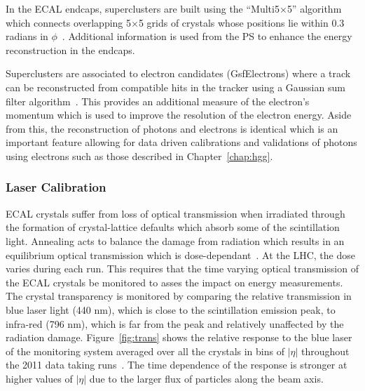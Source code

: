In the ECAL endcaps, superclusters are built using the ``Multi5$\times$5'' algorithm which 
connects overlapping 5$\times$5 grids of crystals whose positions lie within 
0.3 radians in $\phi$~\citep{AN-09-164}. 
Additional information is used from the PS to enhance the energy reconstruction in the endcaps. 

Superclusters are associated to electron candidates (GsfElectrons) 
where a track can be reconstructed from
compatible hits in the tracker using a Gaussian sum filter algorithm~\citep{GSF_Electron_Reconstruction_CMS}.  
This provides an additional measure of the electron's momentum which is used 
to improve the resolution of the electron energy.
Aside from this, the reconstruction of photons and electrons is identical which is an 
important feature allowing for data driven calibrations and validations of photons using 
electrons such as those described in Chapter~\ref{chap:hgg}.


\subsubsection{Laser Calibration}

ECAL crystals suffer from loss of optical transmission when irradiated through 
the formation of crystal-lattice defaults which absorb some of the scintillation light. Annealing
acts to balance the damage from radiation which results in an equilibrium optical 
transmission which is dose-dependant~\citep{TDR1}. 
At the LHC, the dose varies during each run. This requires that the time varying optical transmission of the ECAL 
crystals be monitored to asses the impact on energy measurements.
The crystal transparency is monitored by comparing the relative transmission in blue laser light (440 nm), 
which is close to the scintillation emission peak, to infra-red (796 nm), which is far from the 
peak and relatively unaffected by the radiation damage.
Figure~\ref{fig:trans} shows the relative response to the blue laser of the monitoring system
averaged over all the crystals in bins of $|\eta|$ throughout the 2011 data taking 
runs~\citep{CMS-DP-2012-007}. 
The time dependence of the response is stronger at higher values of $|\eta|$ due to the larger flux
of particles along the beam axis.

